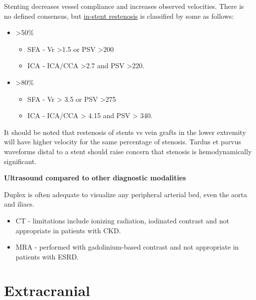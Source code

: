 \documentclass[
]{book}
\begin{document}
Stenting decreases vessel compliance and increases observed velocities.
There is no defined consensus, but \uline{in-stent restenosis} is
classified by some as follows:

\begin{itemize}
\item
  \textgreater50\%

  \begin{itemize}
  \item
    SFA - Vr \textgreater1.5 or PSV \textgreater200 \citep{baril2009, kawarada2013}
  \item
    ICA - ICA/CCA \textgreater2.7 and PSV \textgreater220.\citep{lal2008}
  \end{itemize}
\item
  \textgreater80\%

  \begin{itemize}
  \item
    SFA - Vr \textgreater{} 3.5 or PSV \textgreater275 \citep{baril2009, kawarada2013}
  \item
    ICA - ICA/CCA \textgreater{} 4.15 and PSV \textgreater{} 340.\citep{lal2008}
  \end{itemize}
\end{itemize}

It should be noted that restenosis of stents vs vein grafts in the lower
extremity will have higher velocity for the same percentage of stenosis.
Tardus et parvus waveforms distal to a stent should raise concern that
stenosis is hemodynamically significant.\citep{baril2009, kawarada2013}

\textbf{Ultrasound compared to other diagnostic modalities}

Duplex is often adequate to visualize any peripheral arterial bed, even
the aorta and iliacs.\citep{muelaméndez2018}

\begin{itemize}
\item
  CT - limitations include ionizing radiation, iodinated contrast and
  not appropriate in patients with CKD.
\item
  MRA - performed with gadolinium-based contrast and not appropriate
  in patients with ESRD.
\end{itemize}

\hypertarget{extracranial}{%
\section{Extracranial}\label{extracranial}}
\end{document}
